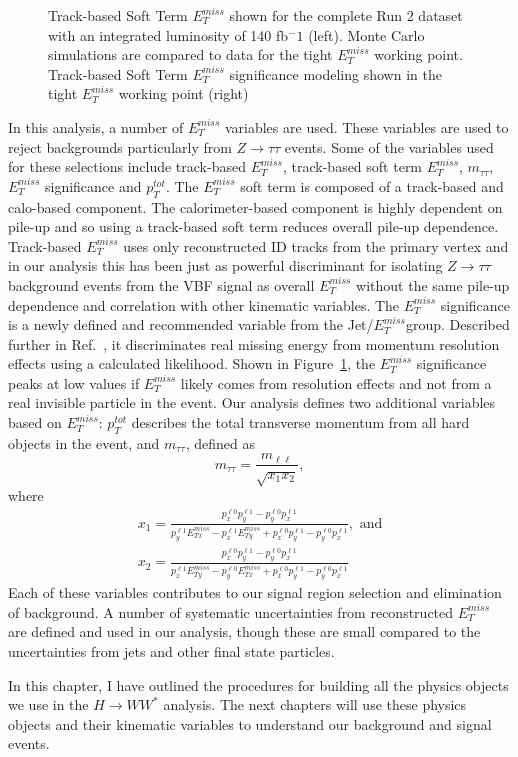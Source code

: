 \begin{figure}[!h]
\begin{minipage}[b]{0.45\textwidth}
  \end{minipage}
    \caption{ Track-based Soft Term $E_T^{miss}$ shown for the complete Run 2 dataset with an integrated luminosity of 140 fb$^-1$ (left). Monte Carlo simulations are compared to data for the tight $E_T^{miss}$ working point. Track-based Soft Term $E_T^{miss}$ significance modeling shown in the tight $E_T^{miss}$ working point (right)~\cite{JETEtmiss}}
    \label{fig:METPerf}
\end{figure}

In this analysis, a number of $E_T^{miss}$ variables are used. These variables are used to reject backgrounds particularly from $Z\rightarrow \tau\tau$ events. Some of the variables used for these selections include track-based $E_T^{miss}$, track-based soft term $E_T^{miss}$, $m_{\tau\tau}$, $E_T^{miss}$ significance and $p_T^{tot}$. The $E_T^{miss}$ soft term is composed of a track-based and calo-based component. The calorimeter-based component is highly dependent on pile-up and so using a track-based soft term reduces overall pile-up dependence. Track-based $E_T^{miss}$ uses only reconstructed ID tracks from the primary vertex and in our analysis this has been just as powerful discriminant for isolating $Z\rightarrow \tau\tau$ background events from the VBF signal as overall $E_T^{miss}$ without the same pile-up dependence and correlation with other kinematic variables. The $E_T^{miss}$ significance is a newly defined and recommended variable from the Jet/$E_T^{miss}$group. Described further in Ref.~\cite{METSig}, it discriminates real missing energy from momentum resolution effects using a calculated likelihood. Shown in Figure~\ref{fig:METPerf}, the $E_T^{miss}$ significance peaks at low values if $E_T^{miss}$ likely comes from resolution effects and not from a real invisible particle in the event. Our analysis defines two additional variables based on $E_T^{miss}$: $p_T^{tot}$ describes the total transverse momentum from all hard objects in the event, and $m_{\tau\tau}$, defined as
\begin{equation}
m_{\tau\tau} = \frac{m_{\ell\ell}}{\sqrt{x_1 x_2}},
\end{equation}
where 
\begin{equation}
\begin{split}
x_1 = \frac{p^{\ell0}_x p^{\ell1}_y-p^{\ell0}_y p^{\ell1}_x}{p^{\ell1}_y E_{Tx}^{miss}-p^{\ell1}_x E_{Ty}^{miss}+p^{\ell0}_x p^{\ell1}_y-p^{\ell0}_y p^{\ell1}_x}, \text{ and} \\
x_2 = \frac{p^{\ell0}_x p^{\ell1}_y-p^{\ell0}_y p^{\ell1}_x}{p^{\ell1}_x E_{Ty}^{miss}-p^{\ell0}_y E_{Tx}^{miss}+p^{\ell0}_x p^{\ell1}_y-p^{\ell0}_y p^{\ell1}_x}
\end{split}
\end{equation}
Each of these variables contributes to our signal region selection and elimination of background. A number of systematic uncertainties from reconstructed $E_T^{miss}$ are defined and used in our analysis, though these are small compared to the uncertainties from jets and other final state particles.

In this chapter, I have outlined the procedures for building all the physics objects we use in the $H\rightarrow WW^*$ analysis. The next chapters will use these physics objects and their kinematic variables to understand our background and signal events.
 
